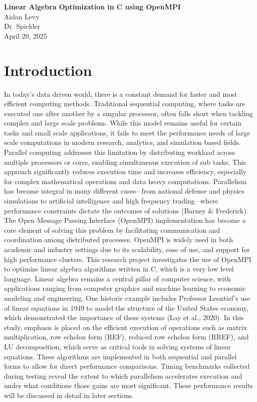 \documentclass[12pt]{article}
\begin{document}
\begin{center}
    \LARGE \textbf{Linear Algebra Optimization in C using OpenMPI} \\
    \vspace{0.3cm}
    \large Aidan Levy \\
    Dr. Spickler \\
    April 20, 2025 \\
\end{center}

\newpage

\doublespacing

\section{Introduction}
In today’s data driven world, there is a constant demand for faster and most efficient computing methods. Traditional sequential computing, where tasks are executed one after another by a singular processor, often falls short when tackling complex and large scale problems. While this model remains useful for certain tasks and small scale applications, it fails to meet the performance needs of large scale computations in modern research, analytics, and simulation based fields. 
Parallel computing addresses this limitation by distributing workload across multiple processors or cores, enabling simultaneous execution of sub tasks. This approach significantly reduces execution time and increases efficiency, especially for complex mathematical operations and data heavy computations. Parallelism has become integral in many different cases-- from national defense and physics simulations to artificial intelligence and high frequency trading-- where performance constraints dictate the outcomes of solutions (Barney \& Frederick). The Open Message Passing Interface (OpenMPI) implementation has become a core element of solving this problem by facilitating communication and coordination among distributed processes. OpenMPI is widely used in both academic and industry settings due to its scalability, ease of use, and support for high performance clusters.
This research project investigates the use of OpenMPI to optimize linear algebra algorithms written in C, which is a very low level language. Linear algebra remains a central pillar of computer science, with applications ranging from computer graphics and machine learning to economic modeling and engineering. One historic example includes Professor Leontief’s use of linear equations in 1949 to model the structure of the United States economy, which demonstrated the importance of these systems (Lay et al., 2020). In this study, emphasis is placed on the efficient execution of operations such as matrix multiplication, row echelon form (REF), reduced row echelon form (RREF), and LU decomposition, which serve as critical tools in solving systems of linear equations. These algorithms are implemented in both sequential and parallel forms to allow for direct performance comparisons. Timing benchmarks collected during testing reveal the extent to which parallelism accelerates execution and under what conditions those gains are most significant. These performance results will be discussed in detail in later sections. 
\end{document}
